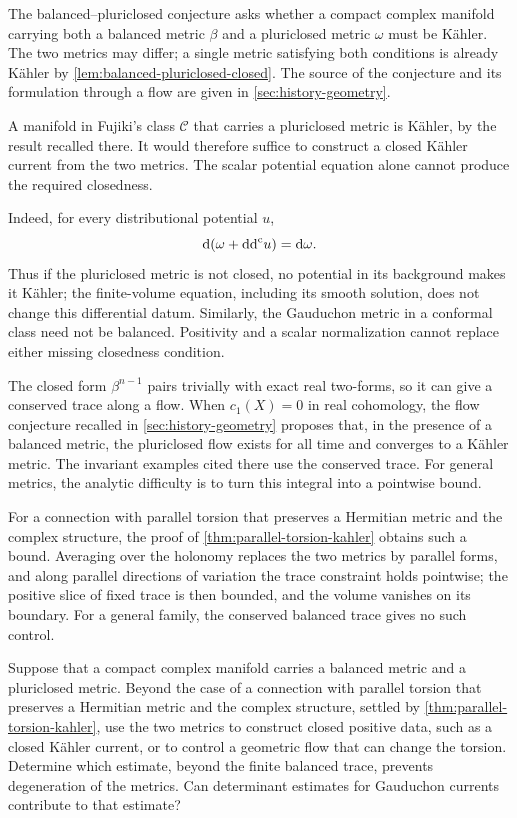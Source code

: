 The balanced--pluriclosed conjecture asks whether a compact complex manifold carrying both a balanced metric $\beta$ and a pluriclosed metric $\omega$ must be K\"ahler. The two metrics may differ; a single metric satisfying both conditions is already K\"ahler by \cref{lem:balanced-pluriclosed-closed}. The source of the conjecture and its formulation through a flow are given in \cref{sec:history-geometry}.

A manifold in Fujiki's class $\mathcal C$ that carries a pluriclosed metric is K\"ahler, by the result recalled there. It would therefore suffice to construct a closed K\"ahler current from the two metrics. The scalar potential equation alone cannot produce the required closedness.

Indeed, for every distributional potential $u$,
\[
 \mathrm{d}(\omega+\mathrm{dd}^{\mathrm{c}} u)=\mathrm{d}\omega.
\]
Thus if the pluriclosed metric is not closed, no potential in its background makes it K\"ahler; the finite-volume equation, including its smooth solution, does not change this differential datum. Similarly, the Gauduchon metric in a conformal class need not be balanced. Positivity and a scalar normalization cannot replace either missing closedness condition.

The closed form $\beta^{n-1}$ pairs trivially with exact real two-forms, so it can give a conserved trace along a flow. When $c_1(X)=0$ in real cohomology, the flow conjecture recalled in \cref{sec:history-geometry} proposes that, in the presence of a balanced metric, the pluriclosed flow exists for all time and converges to a K\"ahler metric. The invariant examples cited there use the conserved trace. For general metrics, the analytic difficulty is to turn this integral into a pointwise bound.

For a connection with parallel torsion that preserves a Hermitian metric and the complex structure, the proof of \cref{thm:parallel-torsion-kahler} obtains such a bound. Averaging over the holonomy replaces the two metrics by parallel forms, and along parallel directions of variation the trace constraint holds pointwise; the positive slice of fixed trace is then bounded, and the volume vanishes on its boundary. For a general family, the conserved balanced trace gives no such control.

\begin{problem}\label{qu:balanced-pluriclosed-program}
Suppose that a compact complex manifold carries a balanced metric and a pluriclosed metric. Beyond the case of a connection with parallel torsion that preserves a Hermitian metric and the complex structure, settled by \cref{thm:parallel-torsion-kahler}, use the two metrics to construct closed positive data, such as a closed K\"ahler current, or to control a geometric flow that can change the torsion. Determine which estimate, beyond the finite balanced trace, prevents degeneration of the metrics. Can determinant estimates for Gauduchon currents contribute to that estimate?
\end{problem}

